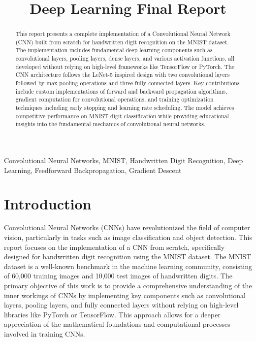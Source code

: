 \documentclass[conference]{IEEEtran}
\begin{document}
\title{Deep Learning Final Report}

\author{
}

\maketitle

\begin{abstract}
This report presents a complete implementation of a Convolutional Neural Network (CNN) built from scratch for handwritten digit recognition on the MNIST dataset. The implementation includes fundamental deep learning components such as convolutional layers, pooling layers, dense layers, and various activation functions, all developed without relying on high-level frameworks like TensorFlow or PyTorch. The CNN architecture follows the LeNet-5 inspired design with two convolutional layers followed by max pooling operations and three fully connected layers. Key contributions include custom implementations of forward and backward propagation algorithms, gradient computation for convolutional operations, and training optimization techniques including early stopping and learning rate scheduling. The model achieves competitive performance on MNIST digit classification while providing educational insights into the fundamental mechanics of convolutional neural networks.
\end{abstract}

\begin{IEEEkeywords}
Convolutional Neural Networks, MNIST, Handwritten Digit Recognition, Deep Learning, Feedforward Backpropagation, Gradient Descent
\end{IEEEkeywords}

\section{Introduction}
Convolutional Neural Networks (CNNs) have revolutionized the field of computer vision, particularly in tasks such as image classification and object detection. This report focuses on the implementation of a CNN from scratch, specifically designed for handwritten digit recognition using the MNIST dataset. The MNIST dataset is a well-known benchmark in the machine learning community, consisting of 60,000 training images and 10,000 test images of handwritten digits.
The primary objective of this work is to provide a comprehensive understanding of the inner workings of CNNs by implementing key components such as convolutional layers, pooling layers, and fully connected layers without relying on high-level libraries like PyTorch or TensorFlow. This approach allows for a deeper appreciation of the mathematical foundations and computational processes involved in training CNNs.
\end{document}
